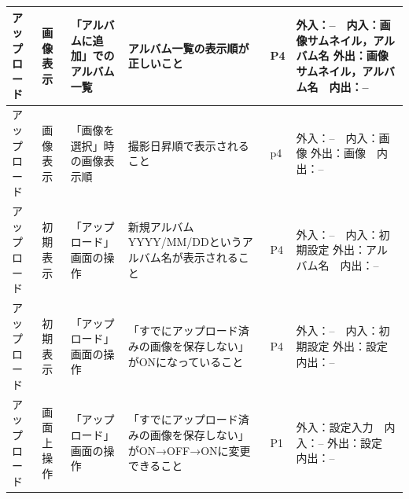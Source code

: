\begin{table}[htbp]
\begin{tabular}{|p{8em}|p{7em}|p{9em}|p{9em}|p{3em}|p{12em}|}
    \hline
    アップロード & 画像表示  & \multicolumn{1}{p{7.5em}|}{「アルバムに追加」でのアルバム一覧} & アルバム一覧の表示順が正しいこと & P4    & 外入：--　内入：画像サムネイル，アルバム名
外出：画像サムネイル，アルバム名　内出：-- \bigstrut\\
    \hline
    アップロード & 画像表示  & \multicolumn{1}{p{7.5em}|}{「画像を選択」時の画像表示順} & 撮影日昇順で表示されること & p4    & 外入：--　内入：画像
外出：画像　内出：-- \bigstrut\\
    \hline
    アップロード & 初期表示  & \multicolumn{1}{p{7.5em}|}{「アップロード」画面の操作} & 新規アルバムYYYY/MM/DDというアルバム名が表示されること & P4    & 外入：--　内入：初期設定
外出：アルバム名　内出：-- \bigstrut\\
    \hline
    アップロード & 初期表示  & \multicolumn{1}{p{7.5em}|}{「アップロード」画面の操作} & 「すでにアップロード済みの画像を保存しない」がONになっていること & P4    & 外入：--　内入：初期設定
外出：設定　内出：-- \bigstrut\\
    \hline
    アップロード & 画面上操作 & \multicolumn{1}{p{7.5em}|}{「アップロード」画面の操作} & 「すでにアップロード済みの画像を保存しない」がON→OFF→ONに変更できること & P1    & 外入：設定入力　内入：--
外出：設定　内出：-- \bigstrut\\
    \hline
    \end{tabular}%
  \label{tab:D-4-ER-1}%
\end{table}%

